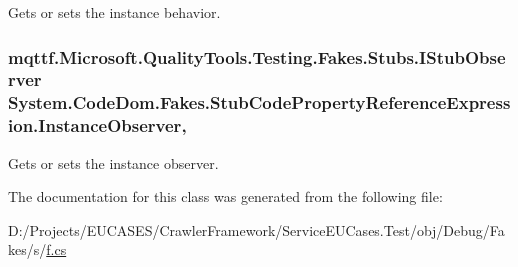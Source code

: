 Gets or sets the instance behavior.

\hypertarget{class_system_1_1_code_dom_1_1_fakes_1_1_stub_code_property_reference_expression_a9a86149f524ad68908bb1a3dff5a2dfa}{
\subsubsection[{Instance\-Observer}]{\setlength{\rightskip}{0pt plus 5cm}mqttf.\-Microsoft.\-Quality\-Tools.\-Testing.\-Fakes.\-Stubs.\-I\-Stub\-Observer System.\-Code\-Dom.\-Fakes.\-Stub\-Code\-Property\-Reference\-Expression.\-Instance\-Observer\hspace{0.3cm}{\ttfamily [get]}, {\ttfamily [set]}}}\label{class_system_1_1_code_dom_1_1_fakes_1_1_stub_code_property_reference_expression_a9a86149f524ad68908bb1a3dff5a2dfa}


Gets or sets the instance observer.



The documentation for this class was generated from the following file\-:\begin{DoxyCompactItemize}
\item 
D\-:/\-Projects/\-E\-U\-C\-A\-S\-E\-S/\-Crawler\-Framework/\-Service\-E\-U\-Cases.\-Test/obj/\-Debug/\-Fakes/s/\hyperlink{s_2f_8cs}{f.\-cs}\end{DoxyCompactItemize}

